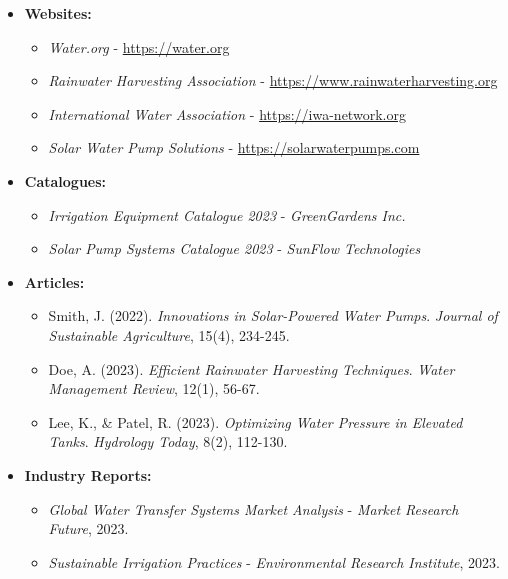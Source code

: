 \documentclass[12pt]{report}
\begin{document}
    \begin{itemize}
        \item \textbf{Websites:}
        \begin{itemize}
            \item \textit{Water.org} - \url{https://water.org}
            \item \textit{Rainwater Harvesting Association} - \url{https://www.rainwaterharvesting.org}
            \item \textit{International Water Association} - \url{https://iwa-network.org}
            \item \textit{Solar Water Pump Solutions} - \url{https://solarwaterpumps.com}
        \end{itemize}
        
        \item \textbf{Catalogues:}
        \begin{itemize}
            \item \textit{Irrigation Equipment Catalogue 2023} - \textit{GreenGardens Inc.}
            \item \textit{Solar Pump Systems Catalogue 2023} - \textit{SunFlow Technologies}
        \end{itemize}
        
        \item \textbf{Articles:}
        \begin{itemize}
            \item Smith, J. (2022). \textit{Innovations in Solar-Powered Water Pumps}. \textit{Journal of Sustainable Agriculture}, 15(4), 234-245.
            \item Doe, A. (2023). \textit{Efficient Rainwater Harvesting Techniques}. \textit{Water Management Review}, 12(1), 56-67.
            \item Lee, K., & Patel, R. (2023). \textit{Optimizing Water Pressure in Elevated Tanks}. \textit{Hydrology Today}, 8(2), 112-130.
        \end{itemize}
        
        \item \textbf{Industry Reports:}
        \begin{itemize}
            \item \textit{Global Water Transfer Systems Market Analysis} - \textit{Market Research Future}, 2023.
            \item \textit{Sustainable Irrigation Practices} - \textit{Environmental Research Institute}, 2023.
        \end{itemize}
    \end{itemize}
    
\end{document}
